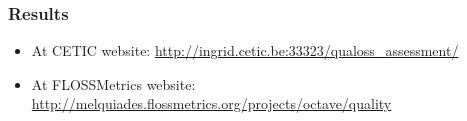 \documentclass{beamer}
\begin{document}
\begin{frame}
\begin{center}
\begin{tabular}{l*{4}{c}}


\end{tabular}

\end{center}
\end{frame}


\begin{frame}
\frametitle{Results}
\begin{center}
\begin{itemize}
\item At CETIC website: \url{http://ingrid.cetic.be:33323/qualoss_assessment/}
\item At FLOSSMetrics website: \url{http://melquiades.flossmetrics.org/projects/octave/quality}
\end{itemize}
\end{center}
\end{frame}
\end{document}

